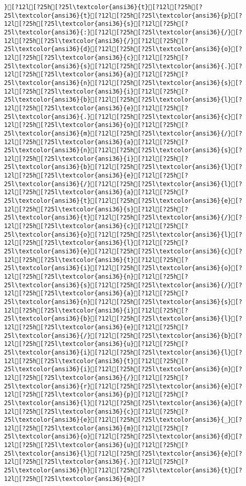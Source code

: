 \documentclass{scrartcl}
\begin{document}
\begin{Verbatim}
}[?12l[?25h[?25l\textcolor{ansi36}{t}[?12l[?25h[?25l\textcolor{ansi36}{t}[?12l[?25h[?25l\textcolor{ansi36}{p}[?12l[?25h[?25l\textcolor{ansi36}{s}[?12l[?25h[?25l\textcolor{ansi36}{:}[?12l[?25h[?25l\textcolor{ansi36}{/}[?12l[?25h[?25l\textcolor{ansi36}{/}[?12l[?25h[?25l\textcolor{ansi36}{d}[?12l[?25h[?25l\textcolor{ansi36}{o}[?12l[?25h[?25l\textcolor{ansi36}{c}[?12l[?25h[?25l\textcolor{ansi36}{s}[?12l[?25h[?25l\textcolor{ansi36}{.}[?12l[?25h[?25l\textcolor{ansi36}{a}[?12l[?25h[?25l\textcolor{ansi36}{n}[?12l[?25h[?25l\textcolor{ansi36}{s}[?12l[?25h[?25l\textcolor{ansi36}{i}[?12l[?25h[?25l\textcolor{ansi36}{b}[?12l[?25h[?25l\textcolor{ansi36}{l}[?12l[?25h[?25l\textcolor{ansi36}{e}[?12l[?25h[?25l\textcolor{ansi36}{.}[?12l[?25h[?25l\textcolor{ansi36}{c}[?12l[?25h[?25l\textcolor{ansi36}{o}[?12l[?25h[?25l\textcolor{ansi36}{m}[?12l[?25h[?25l\textcolor{ansi36}{/}[?12l[?25h[?25l\textcolor{ansi36}{a}[?12l[?25h[?25l\textcolor{ansi36}{n}[?12l[?25h[?25l\textcolor{ansi36}{s}[?12l[?25h[?25l\textcolor{ansi36}{i}[?12l[?25h[?25l\textcolor{ansi36}{b}[?12l[?25h[?25l\textcolor{ansi36}{l}[?12l[?25h[?25l\textcolor{ansi36}{e}[?12l[?25h[?25l\textcolor{ansi36}{/}[?12l[?25h[?25l\textcolor{ansi36}{l}[?12l[?25h[?25l\textcolor{ansi36}{a}[?12l[?25h[?25l\textcolor{ansi36}{t}[?12l[?25h[?25l\textcolor{ansi36}{e}[?12l[?25h[?25l\textcolor{ansi36}{s}[?12l[?25h[?25l\textcolor{ansi36}{t}[?12l[?25h[?25l\textcolor{ansi36}{/}[?12l[?25h[?25l\textcolor{ansi36}{c}[?12l[?25h[?25l\textcolor{ansi36}{o}[?12l[?25h[?25l\textcolor{ansi36}{l}[?12l[?25h[?25l\textcolor{ansi36}{l}[?12l[?25h[?25l\textcolor{ansi36}{e}[?12l[?25h[?25l\textcolor{ansi36}{c}[?12l[?25h[?25l\textcolor{ansi36}{t}[?12l[?25h[?25l\textcolor{ansi36}{i}[?12l[?25h[?25l\textcolor{ansi36}{o}[?12l[?25h[?25l\textcolor{ansi36}{n}[?12l[?25h[?25l\textcolor{ansi36}{s}[?12l[?25h[?25l\textcolor{ansi36}{/}[?12l[?25h[?25l\textcolor{ansi36}{a}[?12l[?25h[?25l\textcolor{ansi36}{n}[?12l[?25h[?25l\textcolor{ansi36}{s}[?12l[?25h[?25l\textcolor{ansi36}{i}[?12l[?25h[?25l\textcolor{ansi36}{b}[?12l[?25h[?25l\textcolor{ansi36}{l}[?12l[?25h[?25l\textcolor{ansi36}{e}[?12l[?25h[?25l\textcolor{ansi36}{/}[?12l[?25h[?25l\textcolor{ansi36}{b}[?12l[?25h[?25l\textcolor{ansi36}{u}[?12l[?25h[?25l\textcolor{ansi36}{i}[?12l[?25h[?25l\textcolor{ansi36}{l}[?12l[?25h[?25l\textcolor{ansi36}{t}[?12l[?25h[?25l\textcolor{ansi36}{i}[?12l[?25h[?25l\textcolor{ansi36}{n}[?12l[?25h[?25l\textcolor{ansi36}{/}[?12l[?25h[?25l\textcolor{ansi36}{r}[?12l[?25h[?25l\textcolor{ansi36}{e}[?12l[?25h[?25l\textcolor{ansi36}{p}[?12l[?25h[?25l\textcolor{ansi36}{l}[?12l[?25h[?25l\textcolor{ansi36}{a}[?12l[?25h[?25l\textcolor{ansi36}{c}[?12l[?25h[?25l\textcolor{ansi36}{e}[?12l[?25h[?25l\textcolor{ansi36}{_}[?12l[?25h[?25l\textcolor{ansi36}{m}[?12l[?25h[?25l\textcolor{ansi36}{o}[?12l[?25h[?25l\textcolor{ansi36}{d}[?12l[?25h[?25l\textcolor{ansi36}{u}[?12l[?25h[?25l\textcolor{ansi36}{l}[?12l[?25h[?25l\textcolor{ansi36}{e}[?12l[?25h[?25l\textcolor{ansi36}{.}[?12l[?25h[?25l\textcolor{ansi36}{h}[?12l[?25h[?25l\textcolor{ansi36}{t}[?12l[?25h[?25l\textcolor{ansi36}{m}[?
\end{Verbatim}
\end{document}
